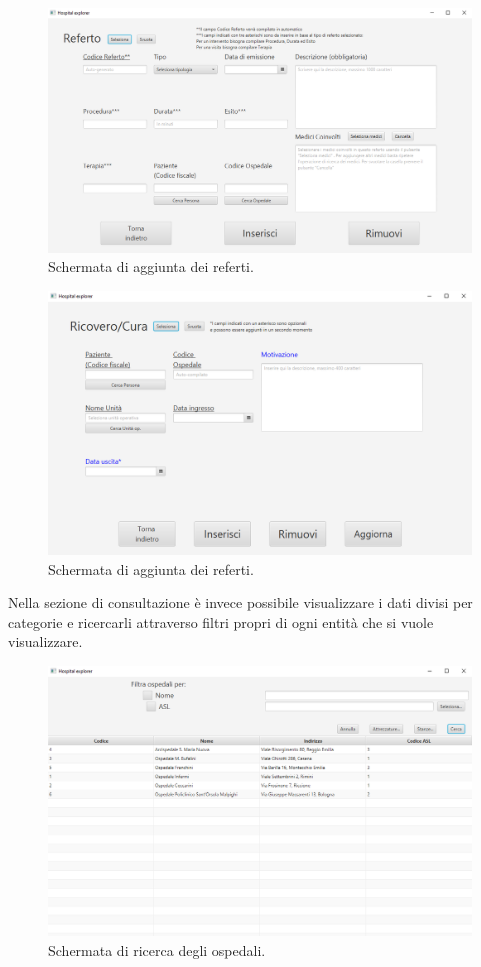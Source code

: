 \documentclass[a4paper,12pt]{report}
\begin{document}
\begin{figure}[H]
	\centering{}
	\includegraphics[width=\textwidth]{img/Screenshot_aggiunta_referti.png}
	\caption{Schermata di aggiunta dei referti.}
	\label{img:add_referti}
\end{figure}

\begin{figure}[H]
	\centering{}
	\includegraphics[width=\textwidth]{img/Screenshot_aggiunta_ricoveri.png}
	\caption{Schermata di aggiunta dei referti.}
	\label{img:add_ricoveri}
\end{figure}

Nella sezione di consultazione è invece possibile visualizzare i dati divisi per categorie e ricercarli attraverso filtri propri di ogni entità che si vuole visualizzare.

\begin{figure}[H]
	\centering{}
	\includegraphics[width=\textwidth]{img/Screenshot_ricerca_ospedale.png}
	\caption{Schermata di ricerca degli ospedali.}
	\label{img:search_hospital}
\end{figure}
\end{document}
